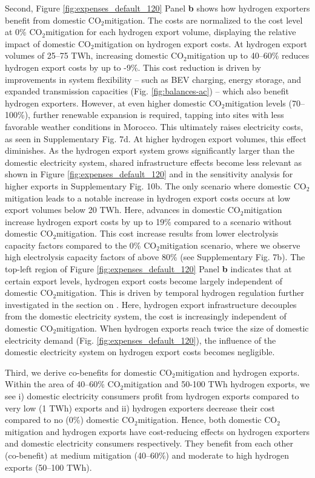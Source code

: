 \documentclass[5p,numafflabel]{elsarticle}
\newcommand{\co}{\ce{CO2}~}
\def\co{CO${}_2${\:}}
\begin{document}
Second, Figure \ref{fig:expenses_default_120} Panel \textbf{b} shows how hydrogen exporters benefit from domestic \co mitigation.
The costs are normalized to the cost level at 0\% \co mitigation for each hydrogen export volume, displaying the relative impact of domestic \co mitigation on hydrogen export costs.
At hydrogen export volumes of 25--75 TWh, increasing domestic \co mitigation up to 40–60\% reduces hydrogen export costs by up to -9\%. 
This cost reduction is driven by improvements in system flexibility -- such as BEV charging, energy storage, and expanded transmission capacities (Fig. \ref{fig:balances-ac}) -- which also benefit hydrogen exporters.
However, at even higher domestic \co mitigation levels (70--100\%), further renewable expansion is required, tapping into sites with less favorable weather conditions in Morocco. This ultimately raises electricity costs, as seen in Supplementary Fig. 7d. %
At higher hydrogen export volumes, this effect diminishes. As the hydrogen export system grows significantly larger than the domestic electricity system, shared infrastructure effects become less relevant 
as shown in Figure \ref{fig:expenses_default_120} and in the sensitivity analysis for higher exports in Supplementary Fig. 10b. %
The only scenario where domestic \co mitigation leads to a notable increase in hydrogen export costs occurs at low export volumes below 20 TWh. Here, advances in domestic \co mitigation increase hydrogen export costs by up to 19\% compared to a scenario without domestic \co mitigation. 
This cost increase results from lower electrolysis capacity factors compared to the 0\% \co mitigation scenario, where we observe high electrolysis capacity factors of above 80\% (see Supplementary Fig. 7b). %
The top-left region of Figure \ref{fig:expenses_default_120} Panel \textbf{b} indicates that at certain export levels, hydrogen export costs become largely independent of domestic \co mitigation. This is driven by temporal hydrogen regulation further investigated in the section on . Here, hydrogen export infrastructure decouples from the domestic electricity system, the cost is increasingly independent of domestic \co mitigation.
When hydrogen exports reach twice the size of domestic electricity demand (Fig. \ref{fig:expenses_default_120}), the influence of the domestic electricity system on hydrogen export costs becomes negligible.


Third, we derive co-benefits for domestic \co mitigation and hydrogen exports. 
Within the area of 40--60\% \co mitigation and 50-100 TWh hydrogen exports, we see i) domestic electricity consumers profit from hydrogen exports compared to very low (1 TWh) exports and ii) hydrogen exporters decrease their cost compared to no (0\%) domestic \co mitigation. 
Hence, both domestic \co mitigation and hydrogen exports have cost-reducing effects on hydrogen exporters and domestic electricity consumers respectively. They benefit from each other (co-benefit) at medium mitigation (40--60\%) and moderate to high hydrogen exports (50--100 TWh). 
\end{document}

